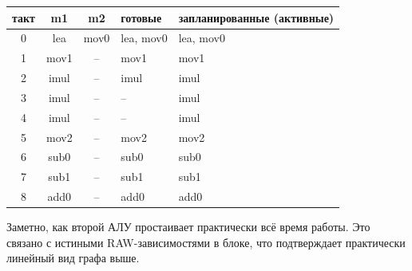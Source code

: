 \begin{table}[H]
    \centering
    \small
    \renewcommand{\arraystretch}{1.3} %
    \begin{tabularx}{\textwidth}{|c|c|c|X|X|}
        \hline
        \textbf{такт} & \textbf{m1} & \textbf{m2} & \textbf{готовые} & \textbf{запланированные (активные)} \\
        \hline
        0 & lea & mov0 & lea, mov0 & lea, mov0 \\ \hline
        1 & mov1 & -- & mov1 & mov1 \\ \hline
        2 & imul & -- & imul & imul \\ \hline
        3 & imul & -- & --   & imul \\ \hline
        4 & imul & -- & --   & imul \\ \hline
        5 & mov2 & -- & mov2 & mov2 \\ \hline
        6 & sub0 & -- & sub0 & sub0 \\ \hline
        7 & sub1 & -- & sub1 & sub1 \\ \hline
        8 & add0 & -- & add0 & add0 \\ \hline
    \end{tabularx}
\end{table}

Заметно, как второй АЛУ простаивает практически всё время работы. Это связано с истиными RAW-зависимостями в блоке, что подтверждает практически линейный вид графа выше. 


